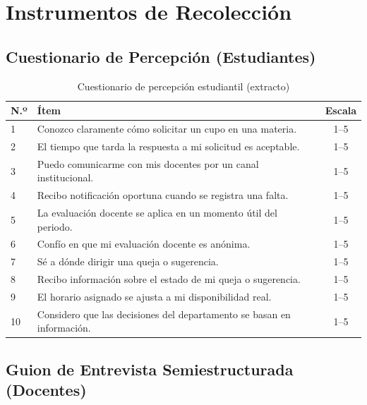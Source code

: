 \chapter{Instrumentos de Recolección}
\label{ap:instrumentos}

\section{Cuestionario de Percepción (Estudiantes)}

\begin{table}[H]
\centering
\caption{Cuestionario de percepción estudiantil (extracto)}
\label{tab:cuestionario-estudiante}
\small
\begin{tabularx}{\textwidth}{@{}p{1.0cm} X c@{}}
\toprule
\rowcolor{azulClaro}
\textbf{N.º} & \textbf{Ítem} & \textbf{Escala} \\
\midrule
1 & Conozco claramente cómo solicitar un cupo en una materia. & 1--5 \\
2 & El tiempo que tarda la respuesta a mi solicitud es aceptable. & 1--5 \\
3 & Puedo comunicarme con mis docentes por un canal institucional. & 1--5 \\
4 & Recibo notificación oportuna cuando se registra una falta. & 1--5 \\
5 & La evaluación docente se aplica en un momento útil del periodo. & 1--5 \\
6 & Confío en que mi evaluación docente es anónima. & 1--5 \\
7 & Sé a dónde dirigir una queja o sugerencia. & 1--5 \\
8 & Recibo información sobre el estado de mi queja o sugerencia. & 1--5 \\
9 & El horario asignado se ajusta a mi disponibilidad real. & 1--5 \\
10 & Considero que las decisiones del departamento se basan en información. & 1--5 \\
\bottomrule
\end{tabularx}
\end{table}

\section{Guion de Entrevista Semiestructurada (Docentes)}

